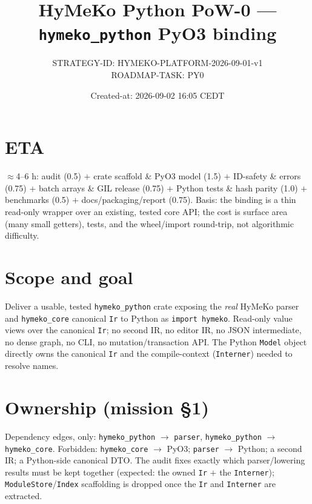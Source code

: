 \documentclass[11pt]{article}
\title{HyMeKo Python PoW-0 --- \texttt{hymeko\_python} PyO3 binding}
\author{STRATEGY-ID: HYMEKO-PLATFORM-2026-09-01-v1 \\ ROADMAP-TASK: PY0}
\date{Created-at: 2026-09-02 16:05 CEDT}
\begin{document}
\maketitle

\section*{ETA}
$\approx$4--6 h: audit (0.5) $+$ crate scaffold \& PyO3 model (1.5) $+$ ID-safety \& errors
(0.75) $+$ batch arrays \& GIL release (0.75) $+$ Python tests \& hash parity (1.0) $+$
benchmarks (0.5) $+$ docs/packaging/report (0.75). Basis: the binding is a thin read-only
wrapper over an existing, tested core API; the cost is surface area (many small getters),
tests, and the wheel/import round-trip, not algorithmic difficulty.

\section{Scope and goal}
Deliver a usable, tested \texttt{hymeko\_python} crate exposing the \emph{real} HyMeKo parser
and \texttt{hymeko\_core} canonical \texttt{Ir} to Python as \texttt{import hymeko}. Read-only
value views over the canonical \texttt{Ir}; no second IR, no editor IR, no JSON intermediate,
no dense graph, no CLI, no mutation/transaction API. The Python \texttt{Model} object directly
owns the canonical \texttt{Ir} and the compile-context (\texttt{Interner}) needed to resolve
names.

\section{Ownership (mission \S1)}
Dependency edges, only: \texttt{hymeko\_python} $\to$ \texttt{parser},
\texttt{hymeko\_python} $\to$ \texttt{hymeko\_core}. Forbidden: \texttt{hymeko\_core} $\to$
PyO3; \texttt{parser} $\to$ Python; a second IR; a Python-side canonical DTO. The audit fixes
exactly which parser/lowering results must be kept together (expected: the owned \texttt{Ir}
$+$ the \texttt{Interner}); \texttt{ModuleStore}/\texttt{Index} scaffolding is dropped once the
\texttt{Ir} and \texttt{Interner} are extracted.
\end{document}
